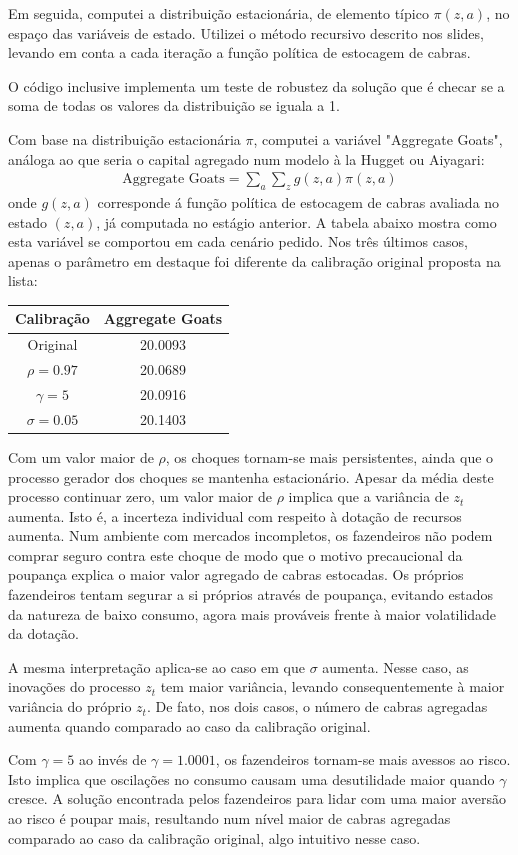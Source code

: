 \documentclass[11pt]{article}
\theoremstyle{definition}
\theoremstyle{solution}
\begin{document}
Em seguida, computei a distribuição estacionária, de elemento típico $\pi(z, a)$, no espaço das variáveis de estado. Utilizei o método recursivo descrito nos slides, levando em conta a cada iteração a função política de estocagem de cabras.

O código inclusive implementa um teste de robustez da solução que é checar se a soma de todas os valores da distribuição se iguala a 1.

Com base na distribuição estacionária $\pi$, computei a variável "Aggregate Goats", análoga ao que seria o capital agregado num modelo à la Hugget ou Aiyagari:
\begin{gather*}
	\text{Aggregate Goats} = \sum\limits_{a}\sum\limits_{z}g(z,a)\pi(z,a)
\end{gather*}
onde $g(z,a)$ corresponde á função política de estocagem de cabras avaliada no estado $(z,a)$, já computada no estágio anterior. A tabela abaixo mostra como esta variável se comportou em cada cenário pedido. Nos três últimos casos, apenas o parâmetro em destaque foi diferente da calibração original proposta na lista:
\begin{center}
	\begin{tabular}{c|c}
	Calibração & Aggregate Goats\\
	\hline
	\hline
	Original & 20.0093\\
	$\rho = 0.97$ & 20.0689\\
	$\gamma = 5$ & 20.0916\\
	$\sigma = 0.05$ & 20.1403
\end{tabular}
\end{center}
Com um valor maior de $\rho$, os choques tornam-se mais persistentes, ainda que o processo gerador dos choques se mantenha estacionário. Apesar da média deste processo continuar zero, um valor maior de $\rho$ implica que a variância de $z_{t}$ aumenta. Isto é, a incerteza individual com respeito à dotação de recursos aumenta. Num ambiente com mercados incompletos, os fazendeiros não podem comprar seguro contra este choque de modo que o motivo precaucional da poupança explica o maior valor agregado de cabras estocadas. Os próprios fazendeiros tentam segurar a si próprios através de poupança, evitando estados da natureza de baixo consumo, agora mais prováveis frente à maior volatilidade da dotação.

A mesma interpretação aplica-se ao caso em que $\sigma$ aumenta. Nesse caso, as inovações do processo $z_{t}$ tem maior variância, levando consequentemente à maior variância do próprio $z_{t}$. De fato, nos dois casos, o número de cabras agregadas aumenta quando comparado ao caso da calibração original.

Com $\gamma = 5$ ao invés de $\gamma = 1.0001$, os fazendeiros tornam-se mais avessos ao risco. Isto implica que oscilações no consumo causam uma desutilidade maior quando $\gamma$ cresce. A solução encontrada pelos fazendeiros para lidar com uma maior aversão ao risco é poupar mais, resultando num nível maior de cabras agregadas comparado ao caso da calibração original, algo intuitivo nesse caso.
\end{document}
